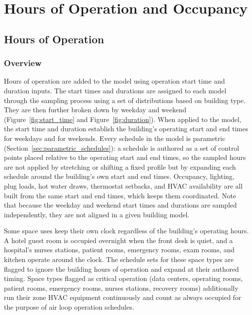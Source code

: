 \section{Hours of Operation and Occupancy}
\label{sec:hoo}

\subsection{Hours of Operation}
\subsubsection{Overview}
Hours of operation are added to the model using operation start time and duration inputs. The start times and durations are assigned to each model through the sampling process using a set of distributions based on building type. They are then further broken down by weekday and weekend (Figure~\ref{fig:start_time} and Figure~\ref{fig:duration}). When applied to the model, the start time and duration establish the building's operating start and end times for weekdays and for weekends. Every schedule in the model is parametric (Section~\ref{sec:parametric_schedules}): a schedule is authored as a set of control points placed relative to the operating start and end times, so the sampled hours are not applied by stretching or shifting a fixed profile but by expanding each schedule around the building's own start and end times. Occupancy, lighting, plug loads, hot water draws, thermostat setbacks, and HVAC availability are all built from the same start and end times, which keeps them coordinated. Note that because the weekday and weekend start times and durations are sampled independently, they are not aligned in a given building model.

Some space uses keep their own clock regardless of the building's operating hours. A hotel guest room is occupied overnight when the front desk is quiet, and a hospital's nurses stations, patient rooms, emergency rooms, exam rooms, and kitchen operate around the clock. The schedule sets for these space types are flagged to ignore the building hours of operation and expand at their authored timing. Space types flagged as critical operation (data centers, operating rooms, patient rooms, emergency rooms, nurses stations, recovery rooms) additionally run their zone HVAC equipment continuously and count as always occupied for the purpose of air loop operation schedules.

